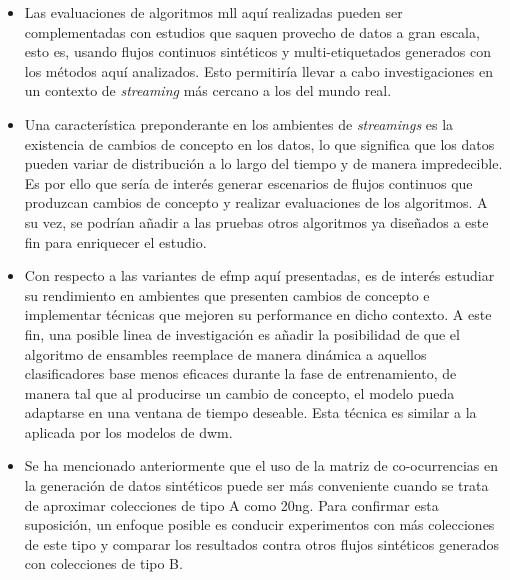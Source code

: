 \begin{itemize}

	\item Las evaluaciones de algoritmos \acrshort{mll} aquí realizadas pueden
	      ser complementadas con estudios que saquen provecho de datos a gran
	      escala, esto es, usando flujos continuos sintéticos y multi-etiquetados
	      generados con los métodos aquí analizados. Esto permitiría llevar a cabo
	      investigaciones en un contexto de \textit{streaming} más cercano a los
	      del mundo real.

	\item Una característica preponderante en los ambientes de
	      \textit{streamings} es la existencia de cambios de concepto en los
	      datos, lo que significa que los datos pueden variar de distribución a
	      lo largo del tiempo y de manera impredecible. Es por ello que sería de
	      interés generar escenarios de flujos continuos que produzcan cambios
	      de concepto y realizar evaluaciones de los algoritmos. A su vez, se
	      podrían añadir a las pruebas otros algoritmos ya diseñados a este fin
	      para enriquecer el estudio.

	\item Con respecto a las variantes de \acrshort{efmp} aquí presentadas, es
	      de interés estudiar su rendimiento en ambientes que presenten cambios
	      de concepto e implementar técnicas que mejoren su performance en dicho
	      contexto. A este fin, una posible linea de investigación es añadir la
	      posibilidad de que el algoritmo de ensambles reemplace de manera
	      dinámica a aquellos clasificadores base menos eficaces durante la fase
	      de entrenamiento, de manera tal que al producirse un cambio de
	      concepto, el modelo pueda adaptarse en una ventana de tiempo deseable.
	      Esta técnica es similar a la aplicada por los modelos de
	      \acrshort{dwm}.

	\item Se ha mencionado anteriormente que el uso de la matriz de
	      co-ocurrencias en la generación de datos sintéticos puede ser más
	      conveniente cuando se trata de aproximar colecciones de tipo A como
	      20ng. Para confirmar esta suposición, un enfoque posible es conducir
	      experimentos con más colecciones de este tipo y comparar los resultados
	      contra otros flujos sintéticos generados con colecciones de tipo B.


\end{itemize}
